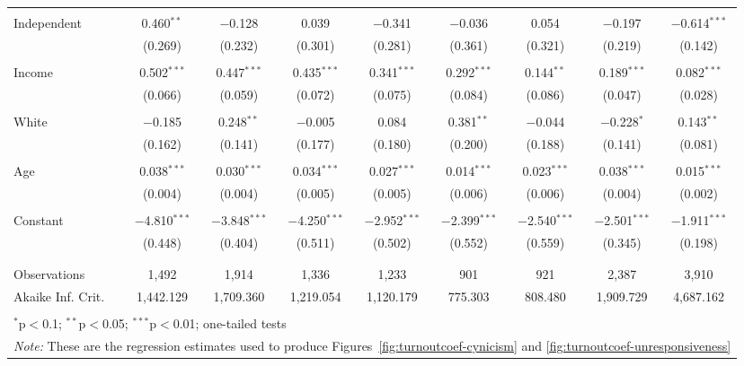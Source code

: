 \documentclass[12pt]{article}
\begin{document}
\begin{appendices}
\begin{refsection}
\begin{table}[!htbp]
\begin{adjustbox}{width=\textwidth,center}
\begin{tabular}{@{\extracolsep{5pt}}lcccccccc}
  & & & & & & & & \\ 
 Independent & 0.460$^{**}$ & $-$0.128 & 0.039 & $-$0.341 & $-$0.036 & 0.054 & $-$0.197 & $-$0.614$^{***}$ \\ 
  & (0.269) & (0.232) & (0.301) & (0.281) & (0.361) & (0.321) & (0.219) & (0.142) \\ 
  & & & & & & & & \\ 
 Income & 0.502$^{***}$ & 0.447$^{***}$ & 0.435$^{***}$ & 0.341$^{***}$ & 0.292$^{***}$ & 0.144$^{**}$ & 0.189$^{***}$ & 0.082$^{***}$ \\ 
  & (0.066) & (0.059) & (0.072) & (0.075) & (0.084) & (0.086) & (0.047) & (0.028) \\ 
  & & & & & & & & \\ 
 White & $-$0.185 & 0.248$^{**}$ & $-$0.005 & 0.084 & 0.381$^{**}$ & $-$0.044 & $-$0.228$^{*}$ & 0.143$^{**}$ \\ 
  & (0.162) & (0.141) & (0.177) & (0.180) & (0.200) & (0.188) & (0.141) & (0.081) \\ 
  & & & & & & & & \\ 
 Age & 0.038$^{***}$ & 0.030$^{***}$ & 0.034$^{***}$ & 0.027$^{***}$ & 0.014$^{***}$ & 0.023$^{***}$ & 0.038$^{***}$ & 0.015$^{***}$ \\ 
  & (0.004) & (0.004) & (0.005) & (0.005) & (0.006) & (0.006) & (0.004) & (0.002) \\ 
  & & & & & & & & \\ 
 Constant & $-$4.810$^{***}$ & $-$3.848$^{***}$ & $-$4.250$^{***}$ & $-$2.952$^{***}$ & $-$2.399$^{***}$ & $-$2.540$^{***}$ & $-$2.501$^{***}$ & $-$1.911$^{***}$ \\ 
  & (0.448) & (0.404) & (0.511) & (0.502) & (0.552) & (0.559) & (0.345) & (0.198) \\ 
  & & & & & & & & \\ 
\hline \\[-1.8ex] 
Observations & 1,492 & 1,914 & 1,336 & 1,233 & 901 & 921 & 2,387 & 3,910 \\ 
Akaike Inf. Crit. & 1,442.129 & 1,709.360 & 1,219.054 & 1,120.179 & 775.303 & 808.480 & 1,909.729 & 4,687.162 \\ 
	\hline 
	\hline \\[-1.8ex] 
	\multicolumn{9}{l}{\footnotesize $^{*}$p$<$0.1; $^{**}$p$<$0.05; $^{***}$p$<$0.01; one-tailed tests} \\ 
	\multicolumn{9}{l}{\footnotesize \textit{Note:} These are the regression estimates used to produce Figures~\ref{fig:turnoutcoef-cynicism} and \ref{fig:turnoutcoef-unresponsiveness}}
	\end{tabular} 
	\end{adjustbox}
\end{table} 
\clearpage



\end{refsection}
\end{appendices}
\end{document}
